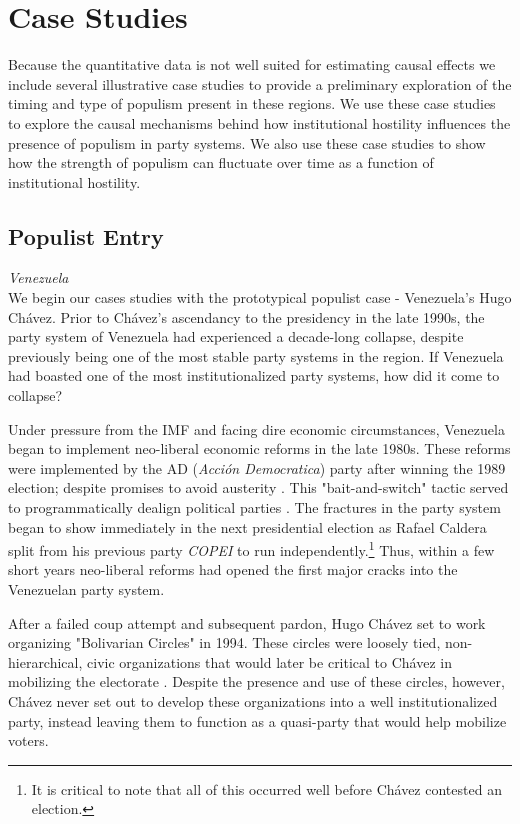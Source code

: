 \documentclass[a4paper,12pt]{article}\usepackage[]{graphicx}\usepackage[]{color}
\begin{document}
 \section*{Case Studies}
Because the quantitative data is not well suited for estimating causal effects we include several illustrative case studies to provide a preliminary exploration of the timing and type of populism present in these regions. We use these case studies to explore the causal mechanisms behind how institutional hostility influences the presence of populism in party systems. We also use these case studies to show how the strength of populism can fluctuate over time as a function of institutional hostility. 
\subsection*{Populist Entry}
\noindent
\textit{Venezuela} \\
We begin our cases studies with the prototypical populist case - Venezuela's Hugo Ch\'{a}vez. Prior to Ch\'{a}vez's ascendancy to the presidency in the late 1990s, the party system of Venezuela had experienced a decade-long collapse, despite previously being one of the most stable party systems in the region. If Venezuela had boasted one of the most institutionalized party systems, how did it come to collapse?
\par
Under pressure from the IMF and facing dire economic circumstances, Venezuela began to implement neo-liberal economic reforms in the late 1980s. These reforms were implemented by the AD (\textit{Acci\'{o}n Democratica}) party after winning the 1989 election; despite promises to avoid austerity \citep{dietz2007thaw}. This  "bait-and-switch" tactic served to programmatically dealign political parties \citep{roberts2013market}. The fractures in the party system began to show immediately in the next presidential election as Rafael Caldera split from his previous party \textit{COPEI} to run independently.\footnote{It is critical to note that all of this occurred well before Ch\'{a}vez contested an election.} Thus, within a few short years neo-liberal reforms had opened the first major cracks into the Venezuelan party system. 
\par
After a failed coup attempt and subsequent pardon, Hugo Ch\'{a}vez set to work organizing "Bolivarian Circles" in 1994. These circles were loosely tied, non-hierarchical, civic organizations that would later be critical to Ch\'{a}vez in mobilizing the electorate \citep{hawkins2003populism, roberts2006populism}. Despite the presence and use of these circles, however, Ch\'{a}vez never set out to develop these organizations into a well institutionalized party, instead leaving them to function as a quasi-party that would help mobilize voters. 
\end{document}
